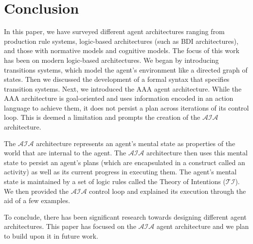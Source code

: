 \chapter{Conclusion}

%
%
%
%

In this paper, we have surveyed different agent architectures ranging from production rule systems, logic-based architectures (such as BDI architectures), and those with normative models and cognitive models.
The focus of this work has been on modern logic-based architectures.
We began by introducing transitions systems, which model the agent’s environment like a directed graph of states.
Then we discussed the development of a formal syntax that specifies transition systems.
Next, we introduced the AAA agent architecture.
While the AAA architecture is goal-oriented and uses information encoded in an action language to achieve them, it does not persist a plan across iterations of its control loop.
This is deemed a limitation and prompts the creation of the $\mathcal{AIA}$ architecture.

The $\mathcal{AIA}$ architecture represents an agent’s mental state as properties of the world that are internal to the agent.
The $\mathcal{AIA}$ architecture then uses this mental state to persist an agent’s plans (which are encapsulated in a construct called an activity) as well as its current progress in executing them.
The agent’s mental state is maintained by a set of logic rules called the Theory of Intentions ($\mathcal{TI}$).
We then provided the $\mathcal{AIA}$ control loop and explained its execution through the aid of a few examples.

To conclude, there has been significant research towards designing different agent architectures.
This paper has focused on the $\mathcal{AIA}$ agent architecture and we plan to build upon it in future work.
